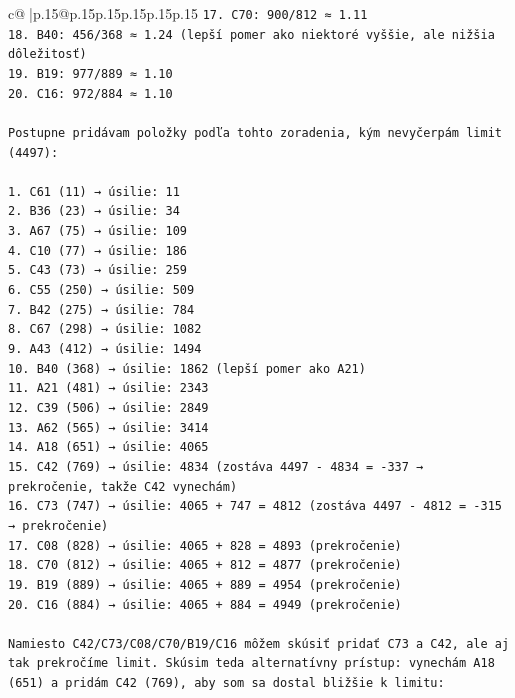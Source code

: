 \documentclass{article}
\begin{document}
{\begin{supertabular}{c@{$\;$}|p{.15\linewidth}@{}p{.15\linewidth}p{.15\linewidth}p{.15\linewidth}p{.15\linewidth}p{.15\linewidth}}
{{{\texttt{17. C70: 900/812 ≈ 1.11} \\
\texttt{18. B40: 456/368 ≈ 1.24 (lepší pomer ako niektoré vyššie, ale nižšia dôležitosť)} \\
\texttt{19. B19: 977/889 ≈ 1.10} \\
\texttt{20. C16: 972/884 ≈ 1.10} \\
\\ 
\texttt{Postupne pridávam položky podľa tohto zoradenia, kým nevyčerpám limit (4497):} \\
\\ 
\texttt{1. C61 (11) → úsilie: 11} \\
\texttt{2. B36 (23) → úsilie: 34} \\
\texttt{3. A67 (75) → úsilie: 109} \\
\texttt{4. C10 (77) → úsilie: 186} \\
\texttt{5. C43 (73) → úsilie: 259} \\
\texttt{6. C55 (250) → úsilie: 509} \\
\texttt{7. B42 (275) → úsilie: 784} \\
\texttt{8. C67 (298) → úsilie: 1082} \\
\texttt{9. A43 (412) → úsilie: 1494} \\
\texttt{10. B40 (368) → úsilie: 1862 (lepší pomer ako A21)} \\
\texttt{11. A21 (481) → úsilie: 2343} \\
\texttt{12. C39 (506) → úsilie: 2849} \\
\texttt{13. A62 (565) → úsilie: 3414} \\
\texttt{14. A18 (651) → úsilie: 4065} \\
\texttt{15. C42 (769) → úsilie: 4834 (zostáva 4497 {-} 4834 = {-}337 → prekročenie, takže C42 vynechám)} \\
\texttt{16. C73 (747) → úsilie: 4065 + 747 = 4812 (zostáva 4497 {-} 4812 = {-}315 → prekročenie)} \\
\texttt{17. C08 (828) → úsilie: 4065 + 828 = 4893 (prekročenie)} \\
\texttt{18. C70 (812) → úsilie: 4065 + 812 = 4877 (prekročenie)} \\
\texttt{19. B19 (889) → úsilie: 4065 + 889 = 4954 (prekročenie)} \\
\texttt{20. C16 (884) → úsilie: 4065 + 884 = 4949 (prekročenie)} \\
\\ 
\texttt{Namiesto C42/C73/C08/C70/B19/C16 môžem skúsiť pridať C73 a C42, ale aj tak prekročíme limit. Skúsim teda alternatívny prístup: vynechám A18 (651) a pridám C42 (769), aby som sa dostal bližšie k limitu:} \\
}}}
\end{supertabular}}
\end{document}
